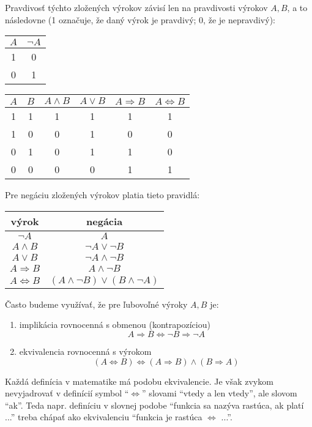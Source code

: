 Pravdivosť týchto zložených výrokov závisí len na pravdivosti výrokov $A, B$,
a to následovne (1 označuje, že daný výrok je pravdivý; 0, že je nepravdivý):
\begin{center}
  \begin{tabular}{|c|c|}
    \hline
    $A$ & $\neg A$ \\
    \hline
    1 & 0 \\
    0 & 1 \\
    \hline
  \end{tabular}
  \quad
  \begin{tabular}{|c|c|c|c|c|c|}
    \hline
    $A$ & $B$ & $A \land B$ & $A \lor B$ & $A \Rightarrow B$ & $A \iff B$ \\
    \hline
    1 & 1 & 1 & 1 & 1 & 1 \\
    1 & 0 & 0 & 1 & 0 & 0 \\
    0 & 1 & 0 & 1 & 1 & 0 \\
    0 & 0 & 0 & 0 & 1 & 1 \\
    \hline
  \end{tabular}
\end{center}

Pre negáciu zložených výrokov platia tieto pravidlá:
\begin{center}
  \begin{tabular}{c | c}
    výrok & negácia \\
    \hline
    $\neg A$ & $A$ \\
    $A \land B$ & $\neg A \lor \neg B$ \\
    $A \lor B$ & $\neg A \land \neg B$ \\
    $A \Rightarrow B$ & $A \land \neg B$ \\
    $A \iff B$ & $(A \land \neg B) \lor (B \land \neg A)$ \\
  \end{tabular}
\end{center}

Často budeme využívať, že pre ľubovoľné výroky $A, B$ je:
\begin{enumerate}
  \item
    implikácia rovnocenná s obmenou (kontrapozíciou)
    \[
      A \Rightarrow B \iff \neg B \Rightarrow \neg A
    \]
  \item
    ekvivalencia rovnocenná s výrokom
    \[
      (A \iff B) \iff (A \Rightarrow B) \land (B \Rightarrow A)
    \]
\end{enumerate}

Každá definícia v matematike má podobu ekvivalencie. Je však zvykom nevyjadrovať
v definícií symbol \enquote{$\iff$} slovami \enquote{vtedy a len vtedy}, ale
slovom \enquote{ak}. Teda napr. definíciu v slovnej podobe \enquote{funkcia sa
nazýva rastúca, ak platí ...} treba chápať ako ekvivalenciu \enquote{funkcia je
rastúca $\iff$ ...}.

